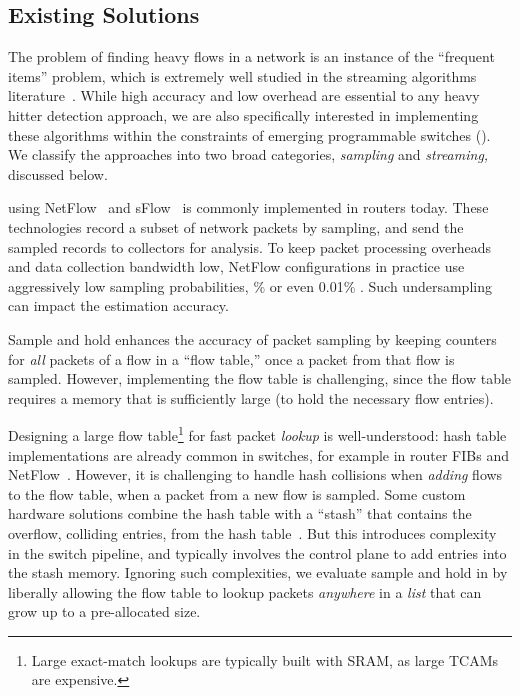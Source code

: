 \subsection{Existing Solutions}\label{sec:related}

The problem of finding heavy flows in a network is an instance of the ``frequent
items'' problem, which is extremely well studied in the streaming algorithms
literature~\cite{hh-cormode-survey}.
%
While high accuracy and low overhead are essential to any heavy hitter detection
approach, we are also specifically interested in implementing these algorithms
within the constraints of emerging programmable switches
().
%
We classify the approaches into two broad categories, {\em sampling} and {\em
  streaming,} discussed below.

 using NetFlow~\cite{cisco-netflow} and sFlow~\cite{sflow}
is commonly implemented in routers today. These technologies record a subset of
network packets by sampling, and send the sampled records to collectors for
analysis. To keep packet processing overheads and data collection bandwidth low,
NetFlow configurations in practice use aggressively low sampling probabilities,
\% or even 0.01\% \cite{sflow-sampling-rate, netflow-sampling-rate}. Such
undersampling can impact the estimation accuracy.

Sample and hold \cite{estan2002new} enhances the accuracy of packet sampling by
keeping counters for {\em all} packets of a flow in a ``flow table,'' once a
packet from that flow is sampled. However, implementing the flow table is
challenging, since the flow table requires a memory that is %
sufficiently large (to hold the necessary flow
entries).

Designing a large flow table\footnote{Large exact-match lookups are typically
  built with SRAM, as large TCAMs are expensive.} for fast packet {\em lookup}
is well-understood: hash table implementations are already common in switches,
for example in router FIBs and NetFlow~\cite{li2016flowradar}.
%
However, it is challenging to handle hash collisions when {\em adding} flows to
the flow table, when a packet from a new flow is sampled.
%
Some custom hardware solutions combine the hash table with a ``stash'' that
contains the overflow, \ie colliding entries, from the hash
table~\cite{sram-tcam-learning}. But this introduces complexity in the switch
pipeline, and typically involves the control plane to add entries into
the stash memory.
%
Ignoring such complexities, we evaluate sample and hold in 
by liberally allowing the flow table to lookup packets {\em anywhere} in a {\em
  list} that can grow up to a pre-allocated size.

